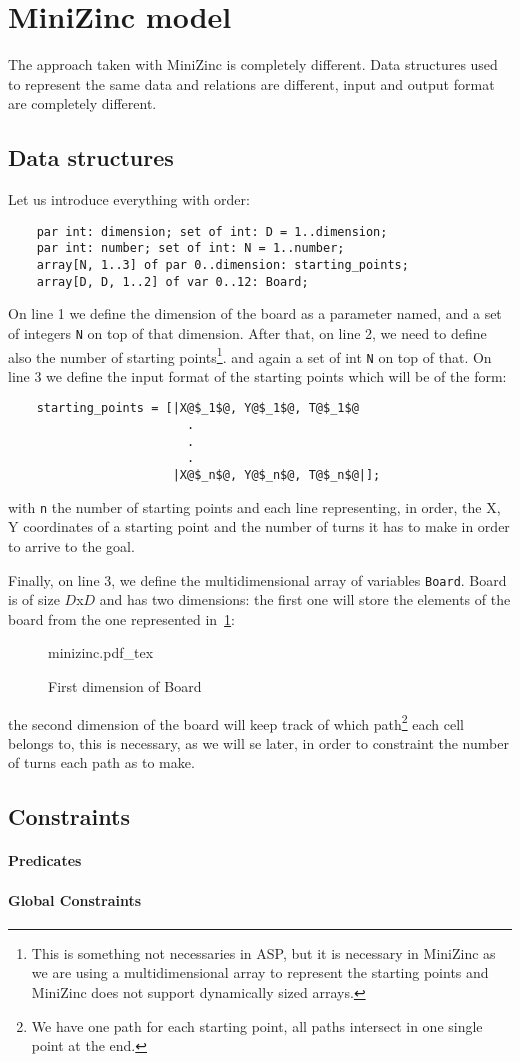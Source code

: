 \section{MiniZinc model}
The approach taken with MiniZinc is completely different. Data structures used to represent the same data and relations are different, input and output format are completely different.
\subsection{Data structures}
Let us introduce everything with order:
\begin{verbatim}
    par int: dimension; set of int: D = 1..dimension; 
    par int: number; set of int: N = 1..number; 
    array[N, 1..3] of par 0..dimension: starting_points; 
    array[D, D, 1..2] of var 0..12: Board;
\end{verbatim}

On line 1 we define the dimension of the board as a parameter named, and a set of integers \texttt{N} on top of that dimension.
After that, on line 2, we need to define also the number of starting points\footnote{This is something not necessaries in ASP, but it is necessary in MiniZinc as we are using a multidimensional array to represent the starting points and MiniZinc does not support dynamically sized arrays.}. and again a set of int \texttt{N} on top of that.
On line 3 we define the input format of the starting points which will be of the form:
\begin{verbatim}
    starting_points = [|X@$_1$@, Y@$_1$@, T@$_1$@
                         .
                         .
                         .
                       |X@$_n$@, Y@$_n$@, T@$_n$@|];
\end{verbatim}
with  \texttt{n} the number of starting points and each line representing, in order, the X, Y coordinates of a starting point and the number of turns it has to make in order to arrive to the goal.

Finally, on line 3, we define the multidimensional array of variables \texttt{Board}. Board is of size $D$x$D$ and has two dimensions: the first one will store the elements of the board from the one represented in~\ref{figm:board}:
\begin{figure}[h]
    \centering
    \def\svgwidth{\columnwidth}
    {minizinc.pdf_tex}
    \caption{First dimension of Board}
    \label{figm:board}
\end{figure}
the second dimension of the board will keep track of which path\footnote{We have one path for each starting point, all paths intersect in one single point at the end.} each cell belongs to, this is necessary, as we will se later, in order to constraint the number of turns each path as to make.

\subsection{Constraints}


\paragraph{Predicates}

\paragraph{Global Constraints}